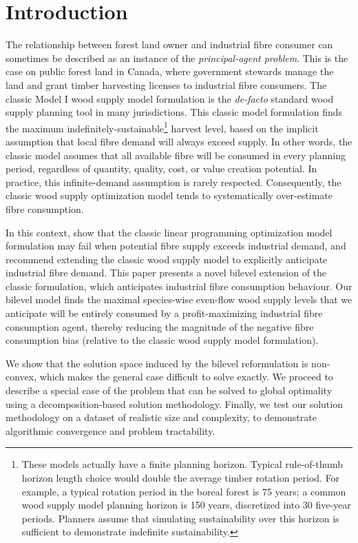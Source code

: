 \section{Introduction}
\label{sec:introduction2}

The relationship between forest land owner and industrial fibre consumer can sometimes be described as an instance of the \emph{principal-agent problem}.
This is the case on public forest land in Canada, where government stewards manage the land and grant timber harvesting licenses to industrial fibre consumers.
The classic Model I \citep{davis2001forest-ch13} wood supply model formulation is the \emph{de-facto} standard wood supply planning tool in many jurisdictions. 
This classic model formulation finds the maximum indefinitely-sustainable\footnote{These models actually have a finite planning horizon. Typical rule-of-thumb horizon length choice would double the average timber rotation period. For example, a typical rotation period in the boreal forest is 75 years; a common wood supply model planning horizon is 150 years, discretized into 30 five-year periods. Planners assume that simulating sustainability over this horizon is sufficient to demonstrate indefinite sustainability.} harvest level, based on the implicit assumption that local fibre demand will always exceed supply.
In other words, the classic model assumes that all available fibre will be consumed in every planning period, regardless of quantity, quality, cost, or value creation potential.
In practice, this infinite-demand assumption is rarely respected.
Consequently, the classic wood supply optimization model tends to systematically over-estimate fibre consumption. 

In this context, \citet{paradis2013risk} show that the classic linear programming optimization model formulation may fail when potential fibre supply exceeds industrial demand, and recommend extending the classic wood supply model to explicitly anticipate industrial fibre demand. 
This paper presents a novel bilevel extension of the classic formulation, which anticipates industrial fibre consumption behaviour.
Our bilevel model finds the maximal species-wise even-flow wood supply levels that we anticipate will be entirely consumed by a profit-maximizing industrial fibre consumption agent, thereby reducing the magnitude of the negative fibre consumption bias (relative to the classic wood supply model formulation).  

We show that the solution space induced by the bilevel reformulation is non-convex, which makes the general case difficult to solve exactly. 
We proceed to describe a special case of the problem that can be solved to global optimality using a decomposition-based solution methodology. 
Finally, we test our solution methodology on a dataset of realistic size and complexity, to demonstrate algorithmic convergence and problem tractability.

